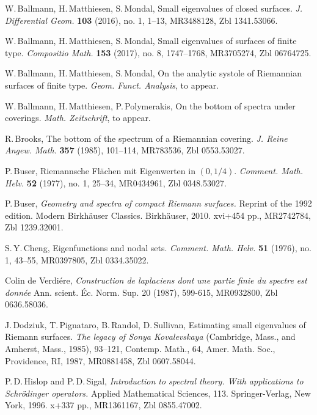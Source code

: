 \documentclass[a4paper,11pt]{amsart}
\numberwithin{equation}{section}
\theoremstyle{definition}
\begin{document}
\begin{thebibliography}{HMZ2}

W.\,Ballmann, H.\,Matthiesen, S.\,Mondal,
Small eigenvalues of closed surfaces.
\emph{J. Differential Geom.} {\bf 103} (2016), no. 1, 1--13,
MR3488128, Zbl 1341.53066.

W.\,Ballmann, H.\,Matthiesen, S.\,Mondal,
Small eigenvalues of surfaces of finite type.
\emph{Compositio Math.} {\bf 153} (2017), no. 8, 1747--1768,
MR3705274, Zbl 06764725.

W.\,Ballmann, H.\,Matthiesen, S.\,Mondal,
On the analytic systole of Riemannian surfaces of finite type.
\emph{Geom. Funct. Analysis}, to appear.

W.\,Ballmann, H.\,Matthiesen, P.\,Polymerakis,
On the bottom of spectra under coverings.
\emph{Math. Zeitschrift}, to appear.

R.\,Brooks,
The bottom of the spectrum of a Riemannian covering.
\emph{J. Reine Angew. Math.} {\bf 357} (1985), 101--114,
MR783536, Zbl 0553.53027.

P.\,Buser,
Riemannsche Fl\"achen mit Eigenwerten in $(0,1/4)$.
\emph{Comment. Math. Helv.} {\bf 52} (1977), no. 1, 25--34,
MR0434961, Zbl 0348.53027.

P.\,Buser,
\emph{Geometry and spectra of compact Riemann surfaces.}
Reprint of the 1992 edition. Modern Birkh\"auser Classics.
Birkh\"auser, 2010. xvi+454 pp.,
MR2742784, Zbl 1239.32001.

S.\,Y.\,Cheng,
Eigenfunctions and nodal sets.
\emph{Comment. Math. Helv.} {\bf 51} (1976), no. 1, 43--55,
MR0397805, Zbl 0334.35022.

 Colin de Verdi\'{e}re, 
\emph{Construction de laplaciens dont une partie finie du spectre est donn\'{e}e}
Ann. scient. \'{E}c. Norm. Sup. 20 (1987), 599-615,
MR0932800, Zbl 0636.58036. 

J.\,Dodziuk, T.\,Pignataro, B.\,Randol, D.\,Sullivan,
Estimating small eigenvalues of Riemann surfaces.
\emph{The legacy of Sonya Kovalevskaya}
(Cambridge, Mass., and Amherst, Mass., 1985),
93--121, Contemp. Math., 64, Amer. Math. Soc., Providence, RI, 1987,
MR0881458, Zbl 0607.58044.

P.\,D.\,Hislop and P.\,D.\,Sigal,
\emph{Introduction to spectral theory. With applications to Schr\"odinger operators.}
Applied Mathematical Sciences, 113. Springer-Verlag, New York, 1996. x+337 pp.,
MR1361167, Zbl 0855.47002.


\end{thebibliography}
\end{document}
